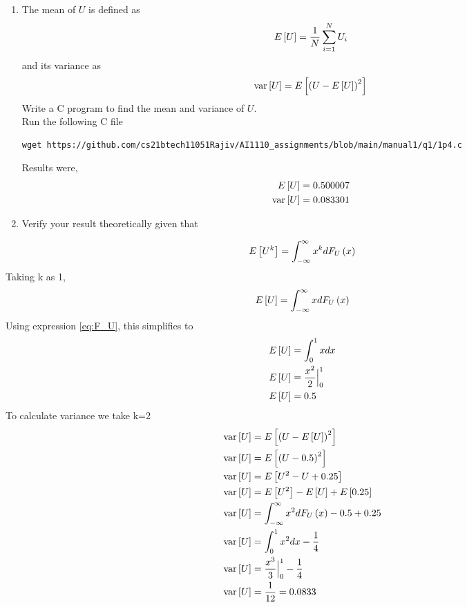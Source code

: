 \documentclass[journal,12pt,twocolumn]{IEEEtran}
\renewcommand\thesection{\arabic{section}}
\begin{document}
\begin{enumerate}[label=\thesection.\arabic*
,ref=\thesection.\theenumi]
\begin{figure}[ht!]
    \caption{The CDF of $U$}
    \label{fig:theory_uni_cdf}
\end{figure}
%
\item
The mean of $U$ is defined as
%
\begin{equation}
E{}\left[U\right] = \frac{1}{N}\sum_{i=1}^{N}U_i
\end{equation}
%
and its variance as
%
\begin{equation}
    \text{var}{}\left[U\right] = E{}\left[\left(U- E{}\left[U\right]\right)^2\right] \end{equation}
Write a C program to  find the mean and variance of $U$. 
\\
\solution Run the following C file
\begin{lstlisting}
wget https://github.com/cs21btech11051Rajiv/AI1110_assignments/blob/main/manual1/q1/1p4.c
\end{lstlisting}
Results were,
\begin{align}
E{}\left[U\right] = 0.500007 \\
\text{var}{}\left[U\right] = 0.083301 
\end{align}
%
\item Verify your result theoretically given that
\end{enumerate}
%
\begin{align}
    E{}\left[U^k\right] = \int_{-\infty}^{\infty}x^kdF_{U}\left(x\right)
    \label{eq:expectation}
\end{align}
\solution Taking k as 1,
\begin{align}
    E{}\left[U\right] = \int_{-\infty}^{\infty}xdF_{U}\left(x\right)
\end{align}
Using expression \eqref{eq:F_U}, this simplifies to
\begin{align}
    E{}\left[U\right] &= \int_{0}^{1}xdx \\
    E{}\left[U\right] &= \frac{x^2}{2} \Big|_0^1 \\
    E{}\left[U\right] &= 0.5
\end{align}
To calculate variance we take k=2
\begin{align}
    \text{var}{}\left[U\right] &= E{}\left[\left(U- E{}\left[U\right]\right)^2\right] \\
    \text{var}{}\left[U\right] &= E{}\left[\left(U-0.5\right)^2\right] \\
    \text{var}{}\left[U\right] &= E{}\left[U^2 - U + 0.25\right]  \\
    \text{var}{}\left[U\right] &= E{}\left[U^2\right] - E{}\left[U\right] + E{}\left[0.25\right]  \\
    \text{var}{}\left[U\right] &= \int_{-\infty}^{\infty}x^2dF_{U}\left(x\right) - 0.5 + 0.25  \\
    \text{var}{}\left[U\right] &= \int_{0}^{1}x^2dx - \frac{1}{4}  \\   
     \text{var}{}\left[U\right] &= \frac{x^3}{3} \Big|_0^1 - \frac{1}{4}  \\    
     \text{var}{}\left[U\right] &= \frac{1}{12} = 0.0833 \\    
\end{align}
%
\end{document}
